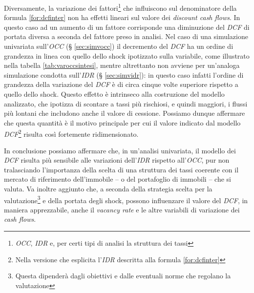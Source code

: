 Diversamente, la variazione dei fattori\footnote{\textit{OCC}, \textit{IDR} e, per certi tipi di analisi la struttura dei tassi} che influiscono sul denominatore della formula \ref{for:dcfinter} non ha effetti lineari sul valore dei {\itshape discount cash flows}. In questo caso ad un aumento di un fattore corrisponde una diminuzione del \textit{DCF} di portata diversa a seconda del fattore preso in analisi.
Nel caso di una simulazione univariata sull'\textit{OCC} (§ \ref{sec:simvocc}) il decremento del \textit{DCF} ha un ordine di grandezza in linea con quello dello shock ipotizzato sulla variabile, come illustrato nella tabella \ref{tab:varoccsintesi}, mentre altrettanto non avviene per un'analoga simulazione condotta sull'\textit{IDR} (§ \ref{sec:simvidr}): in questo caso infatti l'ordine di grandezza della variazione del \textit{DCF} è di circa cinque volte superiore rispetto a quello dello shock. Questo effetto è intrinseco alla costruzione del modello analizzato, che ipotizza di scontare a tassi più rischiosi, e quindi maggiori, i flussi più lontani che includono anche il valore di cessione. Possiamo dunque affermare che questa quantità è il motivo principale per cui il valore indicato dal modello \textit{DCF}\footnote{Nella versione che esplicita l'\textit{IDR} descritta alla formula \ref{for:dcfinter}} risulta così fortemente ridimensionato.

In conclusione possiamo affermare che, in un'analisi univariata, il modello dei \textit{DCF} risulta più sensibile alle variazioni dell'\textit{IDR} rispetto all'\textit{OCC}, pur non tralasciando l'importanza della scelta di una struttura dei tassi coerente con il mercato di riferimento dell'immobile -- o del portafoglio di immobili -- che si valuta. Va inoltre aggiunto che, a seconda della strategia scelta per la valutazione\footnote{Questa dipenderà dagli obiettivi e dalle eventuali norme che regolano la valutazione} e della portata degli shock, possono influenzare il valore del \textit{DCF}, in maniera apprezzabile, anche il {\itshape vacancy rate} e le altre variabili di variazione dei {\itshape cash flows}.
